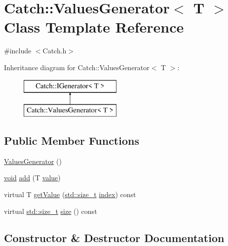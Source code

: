 \hypertarget{class_catch_1_1_values_generator}{}\section{Catch\+:\+:Values\+Generator$<$ T $>$ Class Template Reference}
\label{class_catch_1_1_values_generator}


{\ttfamily \#include $<$Catch.\+h$>$}

Inheritance diagram for Catch\+:\+:Values\+Generator$<$ T $>$\+:\begin{figure}[H]
\begin{center}
\leavevmode
\includegraphics[height=2.000000cm]{class_catch_1_1_values_generator}
\end{center}
\end{figure}
\subsection*{Public Member Functions}
\begin{DoxyCompactItemize}
\item 
\hyperlink{class_catch_1_1_values_generator_a36cd3d75afb1f5502400c3ad7cae7a5e}{Values\+Generator} ()
\item 
\hyperlink{_s_d_l__opengles2__gl2ext_8h_ae5d8fa23ad07c48bb609509eae494c95}{void} \hyperlink{class_catch_1_1_values_generator_a8412c8ce5d9d4fc6ff06d5246d56d538}{add} (T \hyperlink{_s_d_l__opengl__glext_8h_a8ad81492d410ff2ac11f754f4042150f}{value})
\item 
virtual T \hyperlink{class_catch_1_1_values_generator_a60599dd67096ff108471f64ee42acd9d}{get\+Value} (\hyperlink{_s_d_l__config_8h_a7c94ea6f8948649f8d181ae55911eeaf}{std\+::size\+\_\+t} \hyperlink{_s_d_l__opengl__glext_8h_a57f14e05b1900f16a2da82ade47d0c6d}{index}) const 
\item 
virtual \hyperlink{_s_d_l__config_8h_a7c94ea6f8948649f8d181ae55911eeaf}{std\+::size\+\_\+t} \hyperlink{class_catch_1_1_values_generator_a98a80bb0dd682c44e82e4a75e98c4682}{size} () const 
\end{DoxyCompactItemize}


\subsection{Constructor \& Destructor Documentation}
